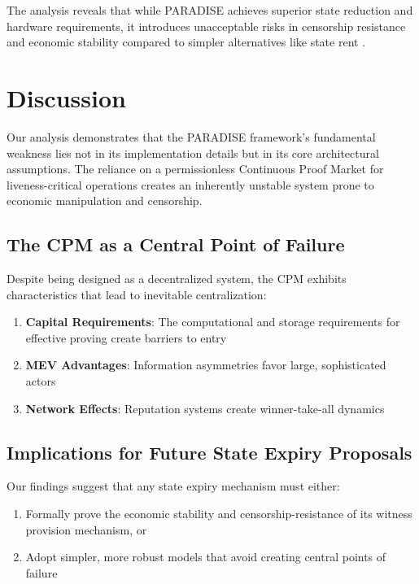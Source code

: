 \documentclass{article}
\begin{document}
The analysis reveals that while PARADISE achieves superior state reduction and hardware requirements, it introduces unacceptable risks in censorship resistance and economic stability compared to simpler alternatives like state rent \cite{eip4762}.

\section{Discussion}

Our analysis demonstrates that the PARADISE framework's fundamental weakness lies not in its implementation details but in its core architectural assumptions. The reliance on a permissionless Continuous Proof Market for liveness-critical operations creates an inherently unstable system prone to economic manipulation and censorship.

\subsection{The CPM as a Central Point of Failure}

Despite being designed as a decentralized system, the CPM exhibits characteristics that lead to inevitable centralization:

\begin{enumerate}
\item \textbf{Capital Requirements}: The computational and storage requirements for effective proving create barriers to entry
\item \textbf{MEV Advantages}: Information asymmetries favor large, sophisticated actors
\item \textbf{Network Effects}: Reputation systems create winner-take-all dynamics
\end{enumerate}

\subsection{Implications for Future State Expiry Proposals}

Our findings suggest that any state expiry mechanism must either:
\begin{enumerate}
\item Formally prove the economic stability and censorship-resistance of its witness provision mechanism, or
\item Adopt simpler, more robust models that avoid creating central points of failure
\end{enumerate}
\end{document}
